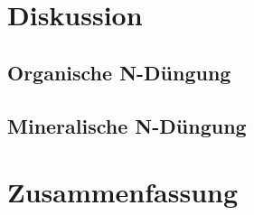 \documentclass[12pt,titlepage]{scrartcl}
\begin{document}
\section{Diskussion}
\label{sec:Disukussion}

\subsection{Organische N-Düngung}
\label{subsec:Dis:orgN}

\subsection{Mineralische N-Düngung}
\label{subsec:Dis:minN}

\section{Zusammenfassung}
\label{sec:Zusammenfassung}

\begin{singlespace} %
\begin{flushleft} %
\printbibliography[title=Literaturverzeichnis]
\end{flushleft}
\end{singlespace}

\end{document}
